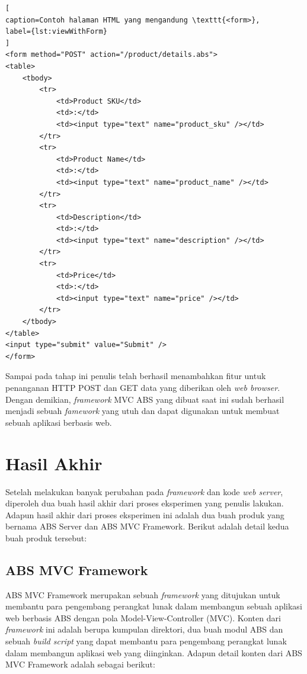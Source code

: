 \begin{lstlisting}[
caption=Contoh halaman HTML yang mengandung \texttt{<form>},
label={lst:viewWithForm}
]
<form method="POST" action="/product/details.abs">
<table>
	<tbody>
		<tr>
			<td>Product SKU</td>
			<td>:</td>
			<td><input type="text" name="product_sku" /></td>
		</tr>
		<tr>
			<td>Product Name</td>
			<td>:</td>
			<td><input type="text" name="product_name" /></td>
		</tr>
		<tr>
			<td>Description</td>
			<td>:</td>
			<td><input type="text" name="description" /></td>
		</tr>
		<tr>
			<td>Price</td>
			<td>:</td>
			<td><input type="text" name="price" /></td>
		</tr>
	</tbody>
</table>
<input type="submit" value="Submit" />
</form>
\end{lstlisting}

Sampai pada tahap ini penulis telah berhasil menambahkan fitur untuk penanganan HTTP POST dan GET data yang diberikan oleh \textit{web browser}. Dengan demikian, \textit{framework} MVC ABS yang dibuat saat ini sudah berhasil menjadi sebuah \textit{famework} yang utuh dan dapat digunakan untuk membuat sebuah aplikasi berbasis web. 

\section{Hasil Akhir}

Setelah melakukan banyak perubahan pada \textit{framework} dan kode \textit{web server}, diperoleh dua buah hasil akhir dari proses eksperimen yang penulis lakukan. Adapun hasil akhir dari proses eksperimen ini adalah dua buah produk yang bernama ABS Server dan ABS MVC Framework. Berikut adalah detail kedua buah produk tersebut:

\subsection{ABS MVC Framework}

ABS MVC Framework merupakan sebuah \textit{framework} yang ditujukan untuk membantu para pengembang perangkat lunak dalam membangun sebuah aplikasi web berbasis ABS dengan pola Model-View-Controller (MVC). Konten dari \textit{framework} ini adalah berupa kumpulan direktori, dua buah modul ABS dan sebuah \textit{build script} yang dapat membantu para pengembang perangkat lunak dalam membangun aplikasi web yang diinginkan. Adapun detail konten dari ABS MVC Framework adalah sebagai berikut:

